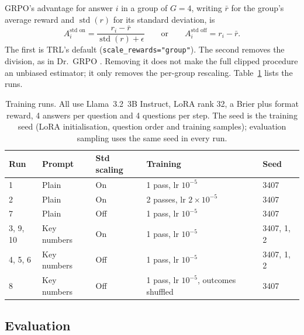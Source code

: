 \documentclass[11pt]{article}
\begin{document}
GRPO's advantage for answer $i$ in a group of $G=4$, writing $\bar r$ for the group's average reward and $\operatorname{std}(r)$ for its standard deviation, is
\[
A_i^{\text{std on}} = \frac{r_i - \bar r}{\operatorname{std}(r) + \epsilon} \qquad\text{or}\qquad A_i^{\text{std off}} = r_i - \bar r .
\]
The first is TRL's default (\texttt{scale\_rewards="group"}). The second removes the division, as in Dr.\ GRPO \citep{liu2025understanding}. Removing it does not make the full clipped procedure an unbiased estimator; it only removes the per-group rescaling. Table~\ref{tab:runs} lists the runs.

\begin{table}[t]
\centering\small
\caption{Training runs. All use Llama~3.2~3B Instruct, LoRA rank 32, a Brier plus format reward, 4 answers per question and 4 questions per step. The seed is the training seed (LoRA initialisation, question order and training samples); evaluation sampling uses the same seed in every run.}
\label{tab:runs}
\begin{tabular}{lllll}
\toprule
Run & Prompt & Std scaling & Training & Seed \\
\midrule
1 & Plain & On & 1 pass, lr $10^{-5}$ & 3407 \\
2 & Plain & On & 2 passes, lr $2\times10^{-5}$ & 3407 \\
7 & Plain & Off & 1 pass, lr $10^{-5}$ & 3407 \\
3, 9, 10 & Key numbers & On & 1 pass, lr $10^{-5}$ & 3407, 1, 2 \\
4, 5, 6 & Key numbers & Off & 1 pass, lr $10^{-5}$ & 3407, 1, 2 \\
8 & Key numbers & Off & 1 pass, lr $10^{-5}$, outcomes shuffled & 3407 \\
\bottomrule
\end{tabular}
\end{table}

\subsection{Evaluation}
\end{document}

